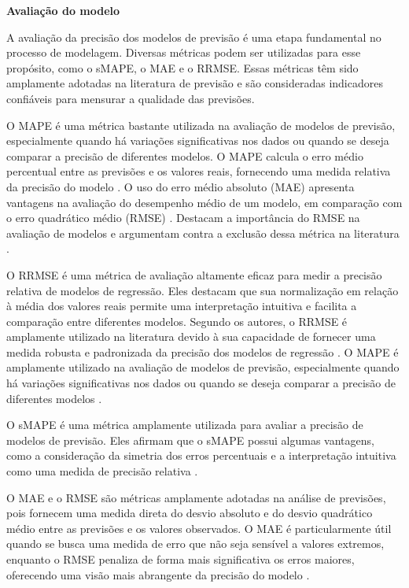 \noindent\textbf{Avalia\c c\~ao do modelo}


A avaliação da precisão dos modelos de previsão é uma etapa fundamental no processo de modelagem. Diversas métricas podem ser utilizadas para esse propósito, como o sMAPE, o MAE e o RRMSE. Essas métricas têm sido amplamente adotadas na literatura de previsão e são consideradas indicadores confiáveis para mensurar a qualidade das previsões.

O MAPE é uma métrica bastante utilizada na avaliação de modelos de previsão, especialmente quando há variações significativas nos dados ou quando se deseja comparar a precisão de diferentes modelos. O MAPE calcula o erro médio percentual entre as previsões e os valores reais, fornecendo uma medida relativa da precisão do modelo \cite{zhang2016}.
O uso do erro médio absoluto (MAE) apresenta vantagens na avaliação do desempenho médio de um modelo, em comparação com o erro quadrático médio (RMSE) \cite{willmott2005advantages}.
Destacam a importância do RMSE na avaliação de modelos e argumentam contra a exclusão dessa métrica na literatura \cite{jones2017}.


O RRMSE é uma métrica de avaliação altamente eficaz para medir a precisão relativa de modelos de regressão. Eles destacam que sua normalização em relação à média dos valores reais permite uma interpretação intuitiva e facilita a comparação entre diferentes modelos. Segundo os autores, o RRMSE é amplamente utilizado na literatura devido à sua capacidade de fornecer uma medida robusta e padronizada da precisão dos modelos de regressão \cite{lopes2020evaluation}. O MAPE é amplamente utilizado na avaliação de modelos de previsão, especialmente quando há variações significativas nos dados ou quando se deseja comparar a precisão de diferentes modelos \cite{peng2017effective}.

O sMAPE é uma métrica amplamente utilizada para avaliar a precisão de modelos de previsão. Eles afirmam que o sMAPE possui algumas vantagens, como a consideração da simetria dos erros percentuais e a interpretação intuitiva como uma medida de precisão relativa \cite{nguyen2020toxicological}.

O MAE e o RMSE são métricas amplamente adotadas na análise de previsões, pois fornecem uma medida direta do desvio absoluto e do desvio quadrático médio entre as previsões e os valores observados. O MAE é particularmente útil quando se busca uma medida de erro que não seja sensível a valores extremos, enquanto o RMSE penaliza de forma mais significativa os erros maiores, oferecendo uma visão mais abrangente da precisão do modelo \cite{jones2017}.

